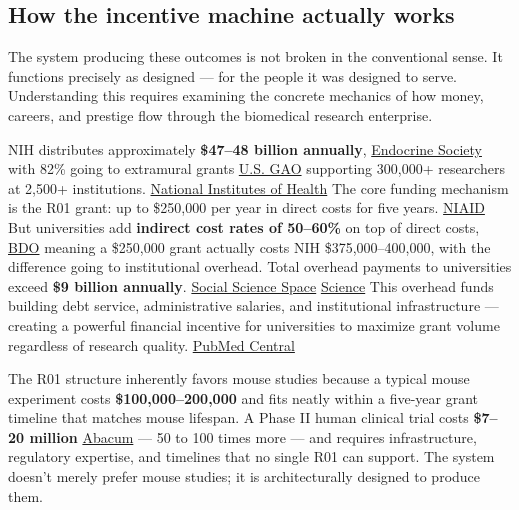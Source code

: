\subsection{How the incentive machine actually works}\label{19_200_billion-how-the-incentive-machine-actually-works}

The system producing these outcomes is not broken in the conventional sense. It functions precisely as designed --- for the people it was designed to serve. Understanding this requires examining the concrete mechanics of how money, careers, and prestige flow through the biomedical research enterprise.

NIH distributes approximately \textbf{\$47--48 billion annually}, \href{https://www.endocrine.org/advocacy/position-statements/biomedical-research-funding}{Endocrine Society} with 82\% going to extramural grants \href{https://www.gao.gov/assets/gao-23-105656.pdf}{U.S. GAO} supporting 300,000+ researchers at 2,500+ institutions. \href{https://www.nih.gov/about-nih/organization/budget}{National Institutes of Health} The core funding mechanism is the R01 grant: up to \$250,000 per year in direct costs for five years. \href{https://www.niaid.nih.gov/grants-contracts/research-project-grants}{NIAID} But universities add \textbf{indirect cost rates of 50--60\%} on top of direct costs, \href{https://www.bdo.com/insights/industries/nonprofit-education/understanding-the-nih-s-new-indirect-cost-rate-policy-what-nonprofit-and-higher-education-cfos-need}{BDO} meaning a \$250,000 grant actually costs NIH \$375,000--400,000, with the difference going to institutional overhead. Total overhead payments to universities exceed \textbf{\$9 billion annually}. \href{https://www.socialsciencespace.com/2025/02/those-indirect-costs-target-by-doge-directly-support-americas-research-excellence/}{Social Science Space} \href{https://www.science.org/content/article/nih-slashes-overhead-payments-research-sparking-outrage}{Science} This overhead funds building debt service, administrative salaries, and institutional infrastructure --- creating a powerful financial incentive for universities to maximize grant volume regardless of research quality. \href{https://pmc.ncbi.nlm.nih.gov/articles/PMC4000813/}{PubMed Central}

The R01 structure inherently favors mouse studies because a typical mouse experiment costs \textbf{\$100,000--200,000} and fits neatly within a five-year grant timeline that matches mouse lifespan. A Phase II human clinical trial costs \textbf{\$7--20 million} \href{https://www.abacum.ai/blog/clinical-trial-costing}{Abacum} --- 50 to 100 times more --- and requires infrastructure, regulatory expertise, and timelines that no single R01 can support. The system doesn't merely prefer mouse studies; it is architecturally designed to produce them.

